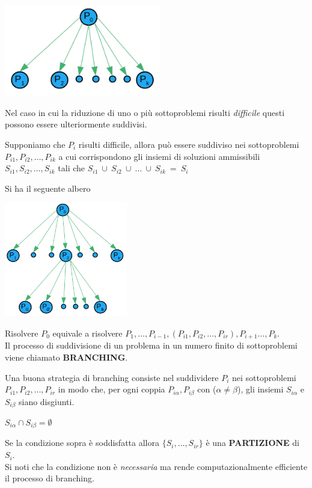 \centerline{\includegraphics[height=4cm]{images/graph14.png}}

Nel caso in cui la riduzione di uno o più sottoproblemi risulti \emph{difficile} questi possono essere ulteriormente suddivisi.

Supponiamo che $P_{i}$ risulti difficile, allora può essere suddiviso nei sottoproblemi $P_{i1},P_{i2},\dots,P_{ik}$ a cui corrispondono gli insiemi di soluzioni ammissibili $S_{i1},S_{i2},\dots,S_{ik}$ tali che $S_{i1}\ \cup\ S_{i2}\ \cup\ \dots\ \cup\ S_{ik}\ =\ S_{i}$

\clearpage
Si ha il seguente albero

\centerline{\includegraphics[height=5cm]{images/graph15.png}}

\noindent
Risolvere $P_{0}$ equivale a risolvere $P_{1},\dots,P_{i-1},(P_{i1},P_{i2},\dots,P_{ir}),P_{i+1}\dots,P_{k}$.\\
Il processo di suddivisione di un problema in un numero finito di sottoproblemi viene chiamato \textbf{BRANCHING}.

Una buona strategia di branching consiste nel suddividere $P_{i}$ nei sottoproblemi $P_{i1},P_{i2},\dots,P_{ir}$ in modo che, per ogni coppia $P_{i\alpha},P_{i\beta}$ con ($\alpha \neq \beta$), gli insiemi $S_{i\alpha}$ e $S_{i\beta}$ siano disgiunti.\\

\centerline{$S_{i\alpha} \cap S_{i\beta} = \emptyset$}

Se la condizione sopra è soddisfatta allora $\{S_{i},\dots,S_{ir}\}$ è una \textbf{PARTIZIONE} di $S_{i}$.\\
Si noti che la condizione non è \emph{necessaria} ma rende computazionalmente efficiente il processo di branching.


